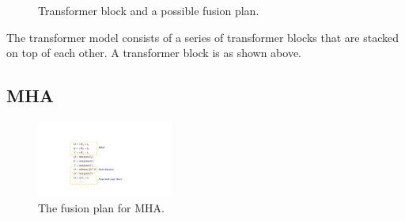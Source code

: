 \begin{figure}[htbp]
    \centering
    \caption{Transformer block and a possible fusion plan.}\label{transformer-block}
\end{figure}
\vspace{-0.1cm}

The transformer model consists of a series of transformer blocks that are stacked on top of each other.
A transformer block is as shown above.

\subsection{MHA}


\begin{figure}[h]
    \centering
    \includegraphics[width=0.4\textwidth]{figures/fused_mha.pdf}
    \caption{The fusion plan for MHA.}
\end{figure}

